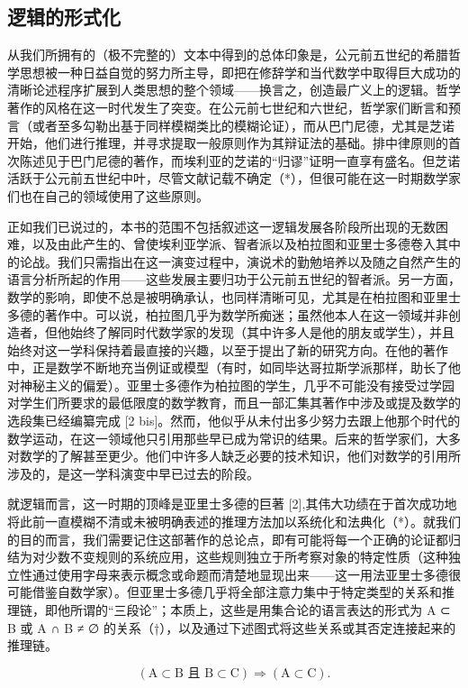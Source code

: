 \subsection*{逻辑的形式化}

从我们所拥有的（极不完整的）文本中得到的总体印象是，公元前五世纪的希腊哲学思想被一种日益自觉的努力所主导，即把在修辞学和当代数学中取得巨大成功的清晰论述程序扩展到人类思想的整个领域——换言之，创造最广义上的逻辑。哲学著作的风格在这一时代发生了突变。在公元前七世纪和六世纪，哲学家们断言和预言（或者至多勾勒出基于同样模糊类比的模糊论证），而从巴门尼德，尤其是芝诺开始，他们进行推理，并寻求提取一般原则作为其辩证法的基础。排中律原则的首次陈述见于巴门尼德的著作，而埃利亚的芝诺的“归谬”证明一直享有盛名。但芝诺活跃于公元前五世纪中叶，尽管文献记载不确定（*），但很可能在这一时期数学家们也在自己的领域使用了这些原则。

正如我们已说过的，本书的范围不包括叙述这一逻辑发展各阶段所出现的无数困难，以及由此产生的、曾使埃利亚学派、智者派以及柏拉图和亚里士多德卷入其中的论战。我们只需指出在这一演变过程中，演说术的勤勉培养以及随之自然产生的语言分析所起的作用——这些发展主要归功于公元前五世纪的智者派。另一方面，数学的影响，即使不总是被明确承认，也同样清晰可见，尤其是在柏拉图和亚里士多德的著作中。可以说，柏拉图几乎为数学所痴迷；虽然他本人在这一领域并非创造者，但他始终了解同时代数学家的发现（其中许多人是他的朋友或学生），并且始终对这一学科保持着最直接的兴趣，以至于提出了新的研究方向。在他的著作中，正是数学不断地充当例证或模型（有时，如同毕达哥拉斯学派那样，助长了他对神秘主义的偏爱）。亚里士多德作为柏拉图的学生，几乎不可能没有接受过学园对学生们所要求的最低限度的数学教育，而且一部汇集其著作中涉及或提及数学的选段集已经编纂完成 {[}2 bis{]}。然而，他似乎从未付出多少努力去跟上他那个时代的数学运动，在这一领域他只引用那些早已成为常识的结果。后来的哲学家们，大多对数学的了解甚至更少。他们中许多人缺乏必要的技术知识，他们对数学的引用所涉及的，是这一学科演变中早已过去的阶段。

就逻辑而言，这一时期的顶峰是亚里士多德的巨著 {[}2{]},其伟大功绩在于首次成功地将此前一直模糊不清或未被明确表述的推理方法加以系统化和法典化（*）。就我们的目的而言，我们需要记住这部著作的总论点，即有可能将每一个正确的论证都归结为对少数不变规则的系统应用，这些规则独立于所考察对象的特定性质（这种独立性通过使用字母来表示概念或命题而清楚地显现出来——这一用法亚里士多德很可能借鉴自数学家）。但亚里士多德几乎将全部注意力集中于特定类型的关系和推理链，即他所谓的“三段论”；本质上，这些是用集合论的语言表达的形式为 A ⊂ B 或 A ∩ B ≠ ∅ 的关系（†），以及通过下述图式将这些关系或其否定连接起来的推理链。

\[
(\mathrm{A} \subset \mathrm{B} \text {   且   } \mathrm{B} \subset \mathrm{C}) \Longrightarrow (\mathrm{A} \subset \mathrm{C}).
\]

